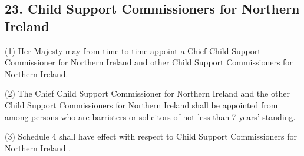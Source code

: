 \documentclass[12pt,a4paper]{article}
\begin{document}
\subsection{23. Child Support Commissioners for Northern Ireland}

(1) Her Majesty may from time to time
 appoint a Chief Child Support Commissioner for Northern Ireland and 
other Child Support Commissioners for Northern Ireland.  %

(2) The Chief Child Support Commissioner for Northern Ireland and the other Child Support Commissioners for Northern Ireland shall be appointed from among persons who are barristers or solicitors of not less than 
7  %
years' standing.

(3) Schedule 4 shall have effect with respect to Child Support Commissioners for Northern Ireland%
.

%

\end{document}
